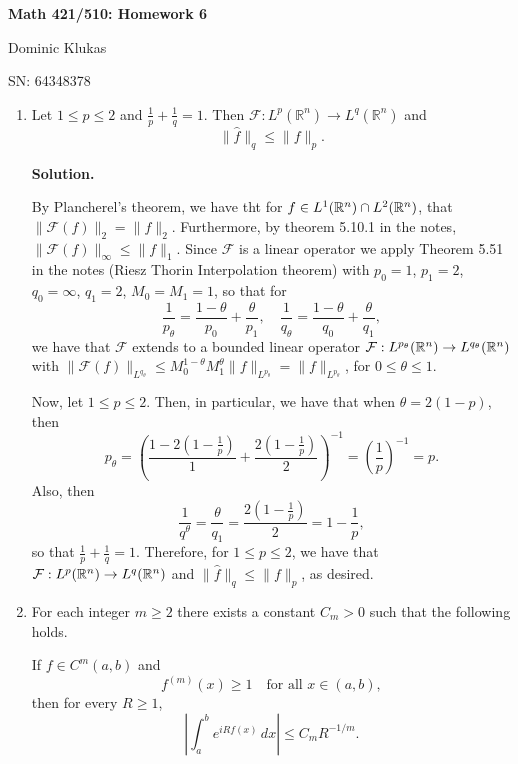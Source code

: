 \documentclass[11pt]{article}
\begin{document}
\noindent

\begin{center}
\textbf{Math 421/510: Homework 6}

Dominic Klukas

SN: 64348378
\end{center}

\vspace{1em}

\begin{enumerate}
\item Let $1 \le p \le 2$ and $\frac{1}{p} + \frac{1}{q} = 1$. Then $\mathcal{F} : L^p(\mathbb{R}^n) \to L^q(\mathbb{R}^n)$ and
\[
\|\hat{f}\|_q \le \|f\|_p.
\]


\textbf{Solution.}

By Plancherel's theorem, we have tht for $f \in L^{1}(\mathbb{R}^{n}) \cap L^{2}(\mathbb{R}^{n})$, that $\|\mathcal{F}(f)\|_{2} = \|f\|_{2}$.
Furthermore, by theorem 5.10.1 in the notes, $\|\mathcal{F}(f)\|_{\infty} \leq \|f\|_{1}$.
Since $\mathcal{F}$ is a linear operator we apply Theorem 5.51 in the notes (Riesz Thorin Interpolation theorem) with $p_0 = 1$, $p_1 = 2$, $q_0 = \infty$, $q_1 = 2$, $M_0 = M_1 = 1$, so that for 
\[
\frac{1}{p_{\theta}} = \frac{1 - \theta}{p_0} + \frac{\theta}{p_1}, \quad \frac{1}{q_{\theta}} = \frac{1 - \theta}{q_0} + \frac{\theta}{q_1}
,\] 
we have that $\mathcal{F}$ extends to a bounded linear operator $\mathcal{F} : L^{p_{\theta}} (\mathbb{R}^{n}) \to L^{q_{\theta}}(\mathbb{R}^{n}) $ 
 with $\|\mathcal{F}(f)\|_{L^{q_{\theta}}} \leq M_{0}^{1 - \theta} M_{1}^{\theta} \|f\|_{L^{p_{\theta}}} = \|f\|_{L^{p_{\theta}}}$, for $0 \leq \theta \leq 1$.

 Now, let $1 \leq p \leq 2$.
 Then, in particular, we have that when $\theta = 2(1 - p) $, then
 \[
     p_{\theta} = \left( \frac{1 - 2(1 - \frac{1}{p})}{1} + \frac{2(1 - \frac{1}{p})}{2} \right)^{-1} = \left( \frac{1}{p} \right)^{-1} = p
 .\] 
 Also, then
 \[
 \frac{1}{q^{\theta}} = \frac{\theta}{q_1} = \frac{2(1 - \frac{1}{p})}{2} = 1 - \frac{1}{p}
 ,\] 
 so that $\frac{1}{p} + \frac{1}{q} = 1$.
 Therefore, for $1 \leq p \leq 2$, we have that $\mathcal{F} : L^{p}(\mathbb{R}^{n}) \to L^{q}(\mathbb{R}^{n})$ and $\|\hat f\|_{q} \leq \| f\|_{p}$, as desired.

\item For each integer $m \ge 2$ there exists a constant $C_m > 0$ such that the following holds.

If $f \in C^m(a,b)$ and
\[
f^{(m)}(x) \ge 1 \quad \text{for all } x \in (a,b),
\]
then for every $R \ge 1$,
\[
\left| \int_a^b e^{i R f(x)} \, dx \right| \le C_m R^{-1/m}.
\]


\end{enumerate}
\end{document}
